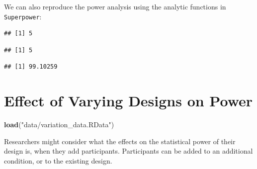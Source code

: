 \documentclass[]{book}
\newenvironment{Shaded}{\begin{snugshade}}{\end{snugshade}}
\newcommand{\KeywordTok}[1]{\textcolor[rgb]{0.13,0.29,0.53}{\textbf{#1}}}
\newcommand{\NormalTok}[1]{#1}
\newcommand{\OperatorTok}[1]{\textcolor[rgb]{0.81,0.36,0.00}{\textbf{#1}}}
\newcommand{\StringTok}[1]{\textcolor[rgb]{0.31,0.60,0.02}{#1}}
\begin{document}
We can also reproduce the power analysis using the analytic functions in \texttt{Superpower}:

\begin{Shaded}
\end{Shaded}

\begin{verbatim}
## [1] 5
\end{verbatim}

\begin{Shaded}
\end{Shaded}

\begin{verbatim}
## [1] 5
\end{verbatim}

\begin{Shaded}
\end{Shaded}

\begin{verbatim}
## [1] 99.10259
\end{verbatim}

\hypertarget{effect-of-varying-designs-on-power}{%
\chapter{Effect of Varying Designs on Power}\label{effect-of-varying-designs-on-power}}

\begin{Shaded}
\begin{Highlighting}[]
\KeywordTok{load}\NormalTok{(}\StringTok{"data/variation_data.RData"}\NormalTok{)}
\end{Highlighting}
\end{Shaded}

Researchers might consider what the effects on the statistical power of their design is, when they add participants. Participants can be added to an additional condition, or to the existing design.
\end{document}
